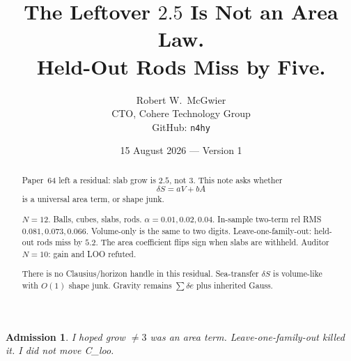 \documentclass[11pt]{article}
\title{\textbf{The Leftover $2.5$ Is Not an Area Law.\\
Held-Out Rods Miss by Five.}}
\author{Robert W.\ McGwier\\
\small CTO, Cohere Technology Group\\
\small GitHub: \texttt{n4hy}}
\date{15 August 2026 --- Version 1}
\newtheorem*{admission}{Admission}
\begin{document}
\maketitle

\begin{abstract}
\noindent
Paper~64 left a residual: slab grow is $2.5$, not $3$.
This note asks whether
\[
\delta S=aV+bA
\]
is a universal area term, or shape junk.

$N=12$. Balls, cubes, slabs, rods.
$\alpha=0.01,0.02,0.04$.
In-sample two-term rel RMS $0.081,0.073,0.066$.
Volume-only is the same to two digits.
Leave-one-family-out: held-out rods miss by
$5.2$. The area coefficient flips sign when
slabs are withheld. Auditor $N=10$: gain and
LOO refuted.

There is no Clausius/horizon handle in this
residual. Sea-transfer $\delta S$ is volume-like
with $O(1)$ shape junk. Gravity remains
$\sum\delta e$ plus inherited Gauss.
\end{abstract}

\begin{admission}
I hoped grow $\neq 3$ was an area term.
Leave-one-family-out killed it. I did not
move C\_loo.
\end{admission}
\end{document}
